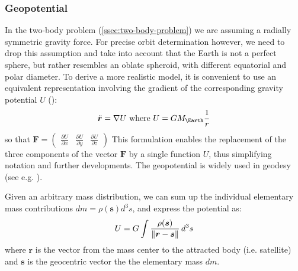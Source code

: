 \subsubsection{Geopotential}\label{sssec:geopotential}

In the two-body problem (\ref{ssec:two-body-problem}) we are assuming a radially 
symmetric gravity force. For precise orbit determination however, we need to 
drop this assumption and take into account that the Earth is not a perfect sphere, 
but rather resembles an oblate spheroid, with different equatorial and polar 
diameter. To derive a more realistic model, it is convenient to use an equivalent 
representation involving the gradient of the corresponding gravity potential $U$ 
(\cite{Montenbruck2000}):
\begin{equation}
  \label{eq:geopotential}
  \ddot{\bm{r}} = \nabla U \textrm{ where } U = G M_{\Earth} \frac{1}{r}
\end{equation}
so that 
$\bm{F} = \begin{pmatrix} \frac{\partial U}{\partial x} & \frac{\partial U}{\partial y} & \frac{\partial U}{\partial z} \end{pmatrix}$
This formulation enables the replacement of the three components of the vector 
$\bm{F}$ by a single function $U$, thus simplifying notation and further 
developments. The geopotential is widely used in geodesy (see e.g. \cite{moritz}).

Given an arbitrary mass distribution, we can sum up the individual elementary 
mass contributions $dm = \rho (\bm{s}) d^3 s$, and express the potential as:
\begin{equation}\label{eq:mont34}
  U = G \int \frac{\rho (\bm{s})}{\lVert\bm{r}-\bm{s}\rVert} \, d^3 s
\end{equation}
where $\bm{r}$ is the vector from the mass center to the attracted body (i.e. satellite) 
and $\bm{s}$ is the geocentric vector the the elementary mass $dm$.

